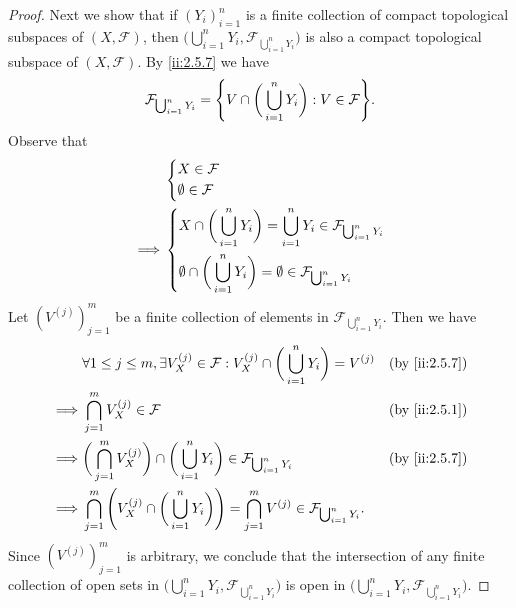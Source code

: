 \begin{proof}
  Next we show that if \((Y_i)_{i = 1}^n\) is a finite collection of compact topological subspaces of \((X, \mathcal{F})\), then \(\big(\bigcup_{i = 1}^n Y_i, \mathcal{F}_{\bigcup_{i = 1}^n Y_i}\big)\) is also a compact topological subspace of \((X, \mathcal{F})\).
  By \cref{ii:2.5.7} we have
  \[
    \mathcal{F}_{\bigcup_{i = 1}^n Y_i} = \set{V \cap \bigg(\bigcup_{i = 1}^n Y_i\bigg) : V \in \mathcal{F}}.
  \]
  Observe that
  \begin{align*}
             & \begin{dcases}
                 X \in \mathcal{F} \\
                 \emptyset \in \mathcal{F}
               \end{dcases}                                                                                 \\
    \implies & \begin{dcases}
                 X \cap \bigg(\bigcup_{i = 1}^n Y_i\bigg) = \bigcup_{i = 1}^n Y_i \in \mathcal{F}_{\bigcup_{i = 1}^n Y_i} \\
                 \emptyset \cap \bigg(\bigcup_{i = 1}^n Y_i\bigg) = \emptyset \in \mathcal{F}_{\bigcup_{i = 1}^n Y_i}
               \end{dcases}
  \end{align*}
  Let \((V^{(j)})_{j = 1}^m\) be a finite collection of elements in \(\mathcal{F}_{\bigcup_{i = 1}^n Y_i}\).
  Then we have
  \begin{align*}
             & \forall 1 \leq j \leq m, \exists V_X^{(j)} \in \mathcal{F} : V_X^{(j)} \cap \bigg(\bigcup_{i = 1}^n Y_i\bigg) = V^{(j)}                             &  & \by{ii:2.5.7} \\
    \implies & \bigcap_{j = 1}^m V_X^{(j)} \in \mathcal{F}                                                                                                         &  & \by{ii:2.5.1} \\
    \implies & \bigg(\bigcap_{j = 1}^m V_X^{(j)}\bigg) \cap \bigg(\bigcup_{i = 1}^n Y_i\bigg) \in \mathcal{F}_{\bigcup_{i = 1}^n Y_i}                              &  & \by{ii:2.5.7} \\
    \implies & \bigcap_{j = 1}^m \Bigg(V_X^{(j)} \cap \bigg(\bigcup_{i = 1}^n Y_i\bigg)\Bigg) = \bigcap_{j = 1}^m V^{(j)} \in \mathcal{F}_{\bigcup_{i = 1}^n Y_i}.
  \end{align*}
  Since \((V^{(j)})_{j = 1}^m\) is arbitrary, we conclude that the intersection of any finite collection of open sets in \(\big(\bigcup_{i = 1}^n Y_i, \mathcal{F}_{\bigcup_{i = 1}^n Y_i}\big)\) is open in \(\big(\bigcup_{i = 1}^n Y_i, \mathcal{F}_{\bigcup_{i = 1}^n Y_i}\big)\).

\end{proof}
